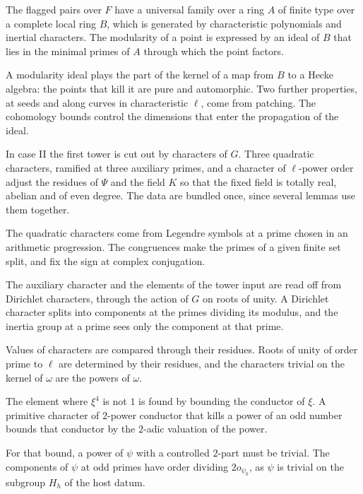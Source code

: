The flagged pairs over $F$ have a universal family over a ring $A$ of finite type over a complete local ring $B$, which is generated by characteristic polynomials and inertial characters. The modularity of a point is expressed by an ideal of $B$ that lies in the minimal primes of $A$ through which the point factors.

A modularity ideal plays the part of the kernel of a map from $B$ to a Hecke algebra: the points that kill it are pure and automorphic. Two further properties, at seeds and along curves in characteristic $\ell$, come from patching. The cohomology bounds control the dimensions that enter the propagation of the ideal.

In case II the first tower is cut out by characters of $G$. Three quadratic characters, ramified at three auxiliary primes, and a character of $\ell$-power order adjust the residues of $\Psi$ and the field $K$ so that the fixed field is totally real, abelian and of even degree. The data are bundled once, since several lemmas use them together.

The quadratic characters come from Legendre symbols at a prime chosen in an arithmetic progression. The congruences make the primes of a given finite set split, and fix the sign at complex conjugation.

The auxiliary character and the elements of the tower input are read off from Dirichlet characters, through the action of $G$ on roots of unity. A Dirichlet character splits into components at the primes dividing its modulus, and the inertia group at a prime sees only the component at that prime.

Values of characters are compared through their residues. Roots of unity of order prime to $\ell$ are determined by their residues, and the characters trivial on the kernel of $\omega$ are the powers of $\omega$.

The element where $\xi^4$ is not $1$ is found by bounding the conductor of $\xi$. A primitive character of $2$-power conductor that kills a power of an odd number bounds that conductor by the $2$-adic valuation of the power.

For that bound, a power of $\psi$ with a controlled $2$-part must be trivial. The components of $\psi$ at odd primes have order dividing $2o_{\psi_0}$, as $\psi$ is trivial on the subgroup $H_h$ of the host datum.

